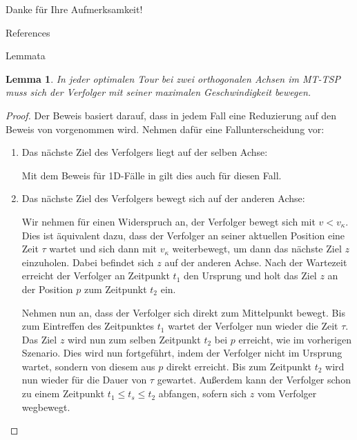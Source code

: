 \documentclass[10pt,table,xcolor=dvipsnames]{beamer}
\newtheorem{lem}{Lemma}
\begin{document}
\nocite{*}
\appendix
\begin{frame}
\Large\center
Danke für Ihre Aufmerksamkeit!
\end{frame}


\begin{frame}[noframenumbering]{References} 
	
	
\end{frame}


\begin{frame}{Lemmata}
\scriptsize
\begin{lem}
\label{lem:1}
In jeder optimalen Tour bei zwei orthogonalen Achsen im MT-TSP muss sich der Verfolger mit seiner  maximalen Geschwindigkeit bewegen.
\end{lem}
 
\framebreak 
 
\begin{proof}
Der Beweis basiert darauf, dass in jedem Fall eine Reduzierung auf den Beweis von \cite{helvig} vorgenommen wird. Nehmen dafür eine Fallunterscheidung vor:
\begin{enumerate}
\item Das nächste Ziel des Verfolgers liegt auf der selben Achse:

Mit dem Beweis für 1D-Fälle in \cite{helvig} gilt dies auch für diesen Fall.\\

\item Das nächste Ziel des Verfolgers bewegt sich auf der anderen Achse: 

Wir nehmen für einen Widerspruch an, der Verfolger bewegt sich mit $v < v_{\kappa}$. Dies ist äquivalent dazu, dass der Verfolger an seiner aktuellen Position eine Zeit $\tau$ wartet und sich dann mit $v_{\kappa}$ weiterbewegt, um dann das nächste Ziel $z$ einzuholen. Dabei befindet sich $z$ auf der anderen Achse. Nach der Wartezeit erreicht der Verfolger an Zeitpunkt $t_1$ den Ursprung und holt das Ziel $z$ an der Position $p$ zum Zeitpunkt $t_2$ ein. 

Nehmen nun an, dass der Verfolger sich direkt zum Mittelpunkt bewegt. Bis zum Eintreffen des Zeitpunktes $t_1$ wartet der Verfolger nun wieder die Zeit $\tau$. Das Ziel $z$ wird nun zum selben Zeitpunkt $t_2$ bei $p$ erreicht, wie im vorherigen Szenario. Dies wird nun fortgeführt, indem der Verfolger nicht im Ursprung wartet, sondern von diesem aus $p$ direkt erreicht. Bis zum Zeitpunkt $t_2$ wird nun wieder für die Dauer von $\tau$ gewartet. Außerdem kann der Verfolger schon zu einem Zeitpunkt $t_1 \leq t_{s} \leq t_2$ abfangen, sofern sich $z$ vom Verfolger wegbewegt. 


\end{enumerate}
\end{proof}
\end{frame}
\end{document}
